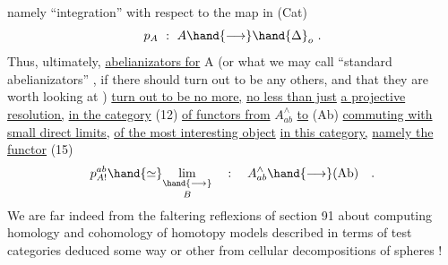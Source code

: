 namely  ``integration'' with respect to the map in (Cat)
\[ p_{A} \ : \ A \hand{\longrightarrow} \hand{\Delta}_{o} \ . \]
Thus, ultimately, \uline{abelianizators for} A (or what we may call ``standard
abelianizators'' , if there should turn out to be any others, and that
they are worth looking at ) \uline{turn out to be no more,} \uline{no less than just}
\uline{a projective resolution,} \uline{in the category} (12) \uline{of functors from} $A^{\wedge}_{ab}$ \uline{to}
(Ab) \uline{commuting with small direct limits,} \uline{of the most interesting object}
\uline{in this category,} \uline{namely the functor}
(15) \[ p^{ab}_{A!} \hand{\simeq} \underset{B}{\underset{\hand{\longrightarrow}}{\text{lim}}} \quad : \quad A^{\wedge}_{ab} \hand{\longrightarrow} (\text{Ab}) \quad . \]
We are far indeed from the faltering reflexions of section 91\hand{,} about
computing homology and cohomology  of  homotopy models
described  in terms of test categories deduced some way or other from
cellular decompositions of spheres !

